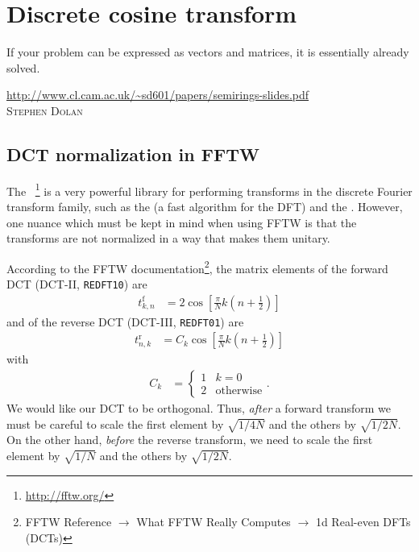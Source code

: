 \chapter{Discrete cosine transform}

\label{chap:dct}

\epigraph{
If your problem can be expressed as vectors and matrices, it is essentially already solved.
}{
\url{http://www.cl.cam.ac.uk/~sd601/papers/semirings-slides.pdf} \\
\textsc{Stephen Dolan}
}


\section{DCT normalization in FFTW}

The ~\cite{frigo2005design}\footnote{
	\url{http://fftw.org/}
} is a very powerful library for performing transforms in the discrete Fourier transform family, such as the  (a fast algorithm for the DFT) and the .
However, one nuance which must be kept in mind when using FFTW is that the transforms are not normalized in a way that makes them unitary.

According to the FFTW documentation\footnote{
	FFTW Reference $\to$ What FFTW Really Computes $\to$ 1d Real-even DFTs (DCTs)
}, the matrix elements of the forward DCT (DCT-II, \texttt{REDFT10}) are
\begin{align}
	t^\textrm{f}_{k,n}
	&= 2 \cos{\left[ \frac{\pi}{N} k \left( n + \frac{1}{2} \right) \right]}
\end{align}
and of the reverse DCT (DCT-III, \texttt{REDFT01}) are
\begin{align}
	t^\textrm{r}_{n,k}
	&= C_k \cos{\left[ \frac{\pi}{N} k \left( n + \frac{1}{2} \right) \right]}
\end{align}
with
\begin{align}
	C_k
	&= \begin{cases}
			1 & k = 0 \\
			2 & \text{otherwise}
		\end{cases}.
\end{align}
We would like our DCT to be orthogonal.
Thus, \emph{after} a forward transform we must be careful to scale the first element by $\sqrt{1 / 4 N}$ and the others by $\sqrt{1 / 2 N}$.
On the other hand, \emph{before} the reverse transform, we need to scale the first element by $\sqrt{1 / N}$ and the others by $\sqrt{1 / 2 N}$.


